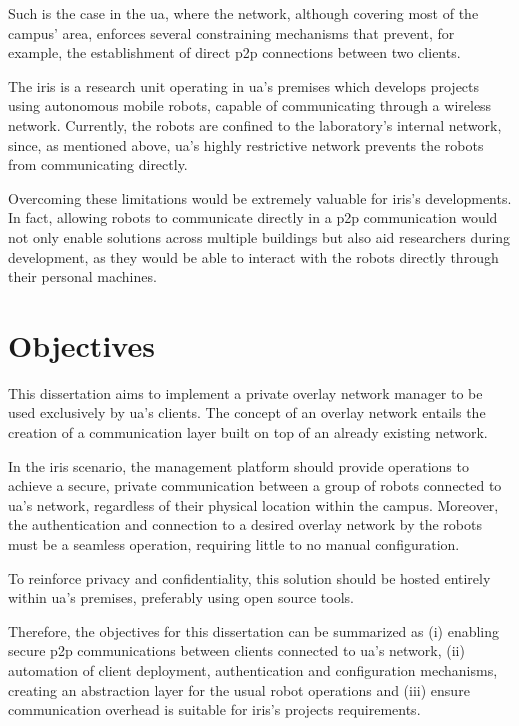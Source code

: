 \documentclass[11pt,twoside,a4paper]{report}
\begin{document}
Such is the case in the \ac{ua}, where the network, although covering most of the campus' area, enforces several constraining mechanisms that prevent, for example, the establishment of direct \ac{p2p} connections between two clients.

The \ac{iris} is a research unit operating in \ac{ua}'s premises which develops projects using autonomous mobile robots, capable of communicating through a wireless network. Currently, the robots are confined to the laboratory's internal network, since, as mentioned above, \ac{ua}'s highly restrictive network prevents the robots from communicating directly.

Overcoming these limitations would be extremely valuable for \ac{iris}'s developments. In fact, allowing robots to communicate directly in a \ac{p2p} communication would not only enable solutions across multiple buildings but also aid researchers during development, as they would be able to interact with the robots directly through their personal machines.

\section{Objectives}
\label{sec:obj}

This dissertation aims to implement a private overlay network manager to be used exclusively by \ac{ua}'s clients. The concept of an overlay network entails the creation of a communication layer built on top of an already existing network.

In the \ac{iris} scenario, the management platform should provide operations to achieve a secure, private communication between a group of robots connected to \ac{ua}'s network, regardless of their physical location within the campus. Moreover, the authentication and connection to a desired overlay network by the robots must be a seamless operation, requiring little to no manual configuration.

To reinforce privacy and confidentiality, this solution should be hosted entirely within \ac{ua}'s premises, preferably using open source tools.

Therefore, the objectives for this dissertation can be summarized as (i) enabling secure \ac{p2p} communications between clients connected to \ac{ua}'s network, (ii) automation of client deployment, authentication and configuration mechanisms, creating an abstraction layer for the usual robot operations and (iii) ensure communication overhead is suitable for \ac{iris}'s projects requirements.
\end{document}
